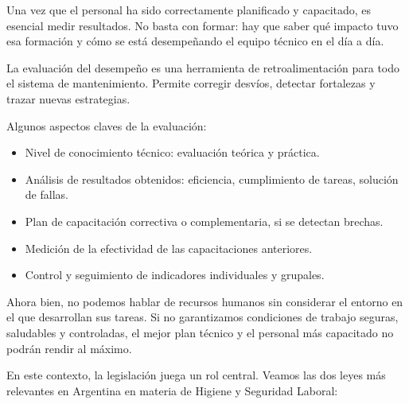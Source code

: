 \documentclass[a4paper,oneside,11pt]{article}
\begin{document}
Una vez que el personal ha sido correctamente planificado y capacitado, es esencial medir resultados. No basta con formar: hay que saber qué impacto tuvo esa formación y cómo se está desempeñando el equipo técnico en el día a día.

La evaluación del desempeño es una herramienta de retroalimentación para todo el sistema de mantenimiento. Permite corregir desvíos, detectar fortalezas y trazar nuevas estrategias. 

Algunos aspectos claves de la evaluación:
\begin{itemize}
    \item Nivel de conocimiento técnico: evaluación teórica y práctica.
    \item Análisis de resultados obtenidos: eficiencia, cumplimiento de tareas, solución de fallas.
    \item Plan de capacitación correctiva o complementaria, si se detectan brechas.
    \item Medición de la efectividad de las capacitaciones anteriores.
    \item Control y seguimiento de indicadores individuales y grupales.
\end{itemize}

Ahora bien, no podemos hablar de recursos humanos sin considerar el entorno en el que desarrollan sus tareas. Si no garantizamos condiciones de trabajo seguras, saludables y controladas, el mejor plan técnico y el personal más capacitado no podrán rendir al máximo.

En este contexto, la legislación juega un rol central. Veamos las dos leyes más relevantes en Argentina en materia de Higiene y Seguridad Laboral:
\end{document}
